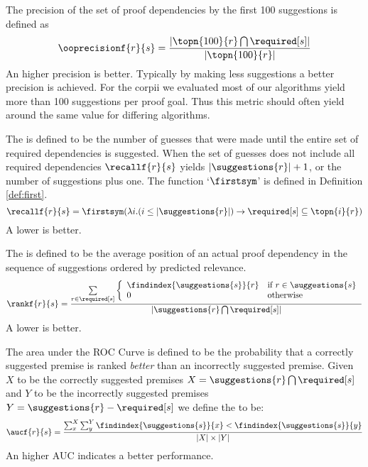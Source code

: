 \begin{definition}[\ooprecision]
  The precision of the set of proof dependencies by the first 100 suggestions is defined as
  \[ \ooprecisionf{r}{s} = \frac{ |\topn{100}{r} \bigcap \required[s]| } { |\topn{100}{r}| } \]
  An higher precision is better.
  Typically by making less suggestions a better precision is achieved.
  For the corpii we evaluated most of our algorithms yield more than 100 suggestions per proof goal.
  Thus this metric should often yield around the same value for differing algorithms.
\end{definition}

\begin{definition}[\recall]
  The \recall is defined to be the number of guesses that were made until the entire set of required dependencies is suggested.
  When the set of guesses does not include all required dependencies $\recallf{r}{s}$ yields $|\suggestions{r}|+1$,
  or the number of suggestions plus one.
  The function `$\firstsym$' is defined in Definition \ref{def:first}.
  \[ \recallf{r}{s} = \firstsym(\lambda i. (i \leq |\suggestions{r}|) \rightarrow \required[s] \subseteq \topn{i}{r}) \]
  A lower \recall is better.
\end{definition}

\begin{definition}[\rank]
  The \rank is defined to be the average position of an actual proof dependency in the sequence of suggestions ordered by predicted relevance.
  \[ \rankf{r}{s} = \frac{
      \sum\limits_{r \in \required[s]} \left\{
        \begin{array}{ll}
          \findindex{\suggestions{s}}{r} & \text{if~} r \in \suggestions{s} \\
          0 & \text{otherwise} \\
        \end{array}
        \right.
    }{
      |\suggestions{r} \bigcap \required[s]|
    }
  \]
  A lower \rank is better.
\end{definition}

\begin{definition}
  The area under the ROC Curve is defined to be the probability that a correctly suggested premise is ranked \emph{better} than an incorrectly suggested premise.
  Given $X$ to be the correctly suggested premises $X = \suggestions{r} \bigcap \required[s]$ and $Y$ to be the incorrectly suggested premises $Y = \suggestions{r} - \required[s]$ we define the \auc to be:
  \[
    \aucf{r}{s} = \frac{
      \sum_x^X \sum_y^Y {\findindex{\suggestions{s}}{x} < \findindex{\suggestions{s}}{y}}
    }{
      |X| \times |Y|
    }
  \]
  An higher AUC indicates a better performance.
\end{definition}

